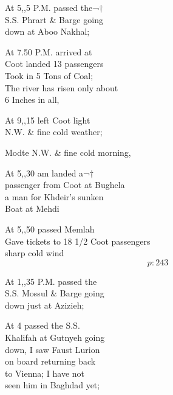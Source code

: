\documentclass{report}
\begin{document}
	\par{
 	At 5,,5 P.M. passed the¬†\ \\S.S. Phrart \& Barge going\ \\down at Aboo Nakhal;\ \\
	}

	\par{
 	At 7.50 P.M. arrived at\ \\Coot landed 13 passengers\ \\Took in 5 Tons of Coal;\ \\The river has risen only about\ \\6 Inches in all,\ \\
	}

	\par{
 	At 9,,15 left Coot light\ \\N.W. \& fine cold weather;\ \\
	}

	\par{
 	Modte N.W. \& fine cold morning,\ \\
	}

	\par{
 	At 5,,30 am landed a¬†\ \\passenger from Coot at Bughela\ \\a man for Khdeir's sunken\ \\Boat at Mehdi\ \\
	}

	\par{
 	At 5,,50 passed Memlah\ \\Gave tickets to 18 1/2 Coot passengers\ \\sharp cold wind\ \\
  \[p: 243 \]

	}


	\par{
 	At 1,,35 P.M. passed the\ \\S.S. Mossul \& Barge going\ \\down just at Azizieh;\ \\
	}

	\par{
 	At 4 passed the S.S.\ \\Khalifah at Gutnyeh going\ \\down, I saw Faust Lurion\ \\on board returning back\ \\to Vienna; I have not\ \\seen him in Baghdad yet;\ \\
	}
\end{document}
